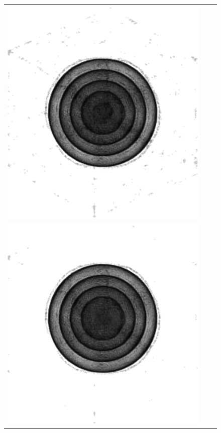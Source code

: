 \documentclass[9pt]{beamer}
\begin{document}
\begin{frame}
\begin{figure}
\begin{tabular}{c c c }
													\includegraphics[scale=0.2]{Threshold100}\\
													\includegraphics[scale=0.2]{Threshold125}&

\end{tabular}
\end{figure}
\end{frame}
\end{document}
